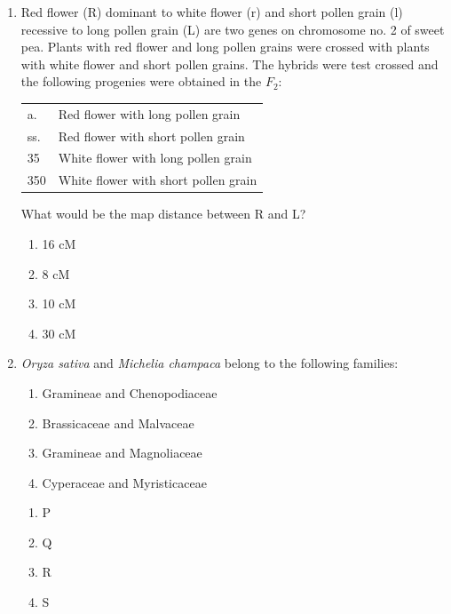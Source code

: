 \documentclass[journal,12pt,onecolumn]{IEEEtran}
\begin{document}
\begin{enumerate}
\item Red flower (R) dominant to white flower (r) and short pollen grain (l) recessive to long pollen grain (L) are two genes on chromosome no. 2 of sweet pea. Plants with red flower and long pollen grains were crossed with plants with white flower and short pollen grains. The hybrids were test crossed and the following progenies were obtained in the $F_2$:  

\begin{tabular}{ll}
a. & Red flower with long pollen grain \\
ss. & Red flower with short pollen grain \\
35 & White flower with long pollen grain \\
350 & White flower with short pollen grain \\
\end{tabular}  

What would be the map distance between R and L?  

\begin{multicols}{2}
\begin{enumerate}[label=(\Alph*)]
\item 16 cM
\item 8 cM
\item 10 cM
\item 30 cM
\end{enumerate}
\end{multicols}

\item \textit{Oryza sativa} and \textit{Michelia champaca} belong to the following families:  
\begin{enumerate}[label=\Alph*:,start=16]
\item Gramineae and Chenopodiaceae
\item Brassicaceae and Malvaceae
\item Gramineae and Magnoliaceae
\item Cyperaceae and Myristicaceae
\end{enumerate}

\begin{multicols}{2}
\begin{enumerate}[label=(\Alph*)]
\item P
\item Q
\item R
\item S
\end{enumerate}
\end{multicols}


\end{enumerate}
\end{document}
